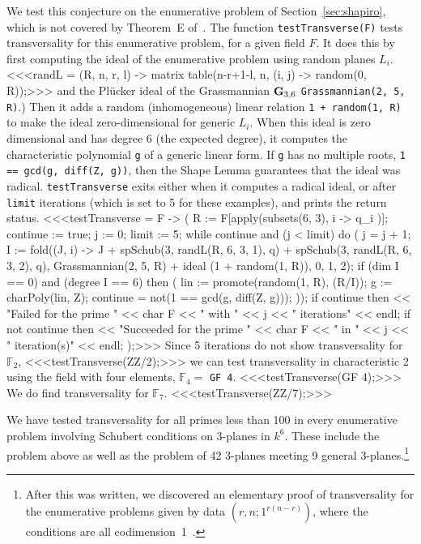 We test this conjecture on the enumerative problem of 
Section~\ref{sec:shapiro}, which is not covered by 
Theorem~E of~\cite{SO:So97a}.
The function {\tt testTransverse(F)} tests transversality
for this enumerative problem, for a given field $F$. 
It does this by first computing the ideal of the enumerative problem using 
random planes $L_i$.
%
<<<randL = (R, n, r, l) -> 
          matrix table(n-r+1-l, n, (i, j) -> random(0, R));>>>
%
and the Pl\"ucker ideal of the Grassmannian ${\bf G}_{3,6}$
 {\tt Grassmannian(2, 5, R)}.)
Then it adds a random (inhomogeneous) linear relation 
 {\tt 1 + random(1, R)} to make the ideal zero-dimensional for generic $L_i$. 
When this ideal is zero dimensional and has degree 6 (the expected degree), it
computes the characteristic polynomial {\tt g} of a generic linear form.
If {\tt g} has no multiple roots, {\tt 1 == gcd(g, diff(Z, g))}, 
then the Shape Lemma
guarantees that the ideal was radical.
{\tt testTransverse} exits either when it computes a radical ideal,
or after {\tt limit} iterations (which is set to 5 for these examples), and
prints the return status. 
%
<<<testTransverse = F -> (
      R := F[apply(subsets(6, 3), i -> q_i )];
      continue := true;
      j := 0;  
      limit := 5;
      while continue and (j < limit) do (
           j = j + 1;
           I := fold((J, i) -> J + 
                     spSchub(3, randL(R, 6, 3, 1), q) +
                     spSchub(3, randL(R, 6, 3, 2), q),
                     Grassmannian(2, 5, R) + 
                     ideal (1 + random(1, R)),
                     {0, 1, 2});
           if (dim I == 0) and (degree I == 6) then (
           lin := promote(random(1, R), (R/I));
           g := charPoly(lin, Z);
           continue = not(1 == gcd(g, diff(Z, g)));
           ));
      if continue then << "Failed for the prime " << char F << 
         " with " << j << " iterations" << endl;
      if not continue then << "Succeeded for the prime " <<
          char F << " in " << j << " iteration(s)" << endl;
      );>>>
%
Since 5 iterations do not show transversality for ${\mathbb F}_2$,
%
<<<testTransverse(ZZ/2);>>>
%
we can test transversality in characteristic 2 using the field with
four elements, ${\mathbb F}_4=$ {\tt GF 4}.
%
<<<testTransverse(GF 4);>>>
%
We do find transversality for ${\mathbb F}_7$.
%
<<<testTransverse(ZZ/7);>>>

We have tested transversality for all primes less than 100 in every
enumerative problem involving Schubert conditions on 3-planes in $k^6$.
These include the problem above as well as the problem of 42 3-planes meeting
9 general 3-planes.\footnote{After this was written, we discovered an
elementary proof of transversality for the enumerative problems given by data 
$(r,n;1^{r(n-r)})$, where the conditions are all
codimension~1~\cite{SO:So_trans}.}


